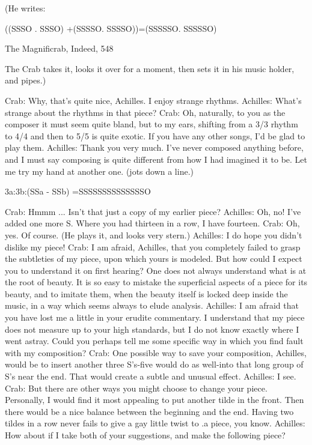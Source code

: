 {   (He writes:

                 ((SSSO . SSSO) +(SSSSO. SSSSO))=(SSSSSO. SSSSSO)



   The Magnificrab, Indeed,                                                                  548

  The Crab takes it, looks it over for a moment, then sets it in his music holder, and pipes.)

Crab: Why, that's quite nice, Achilles. I enjoy strange rhythms.
Achilles: What's strange about the rhythms in that piece?
Crab: Oh, naturally, to you as the composer it must seem quite bland, but to my ears,
  shifting from a 3/3 rhythm to 4/4 and then to 5/5 is quite exotic. If you have any other
  songs, I'd be glad to play them. Achilles: Thank you very much. I've never composed
  anything before, and I must say composing is quite different from how I had imagined it
  to be. Let me try my hand at another one. (jots down a line.)

                         3a:3b:(SSa - SSb) =SSSSSSSSSSSSSSO

Crab: Hmmm ... Isn't that just a copy of my earlier piece?
Achilles: Oh, no! I've added one more S. Where you had thirteen in a row, I have fourteen.
Crab: Oh, yes. Of course. (He plays it, and looks very stern.)
Achilles: I do hope you didn't dislike my piece!
Crab: I am afraid, Achilles, that you completely failed to grasp the subtleties of my piece,
  upon which yours is modeled. But how could I expect you to understand it on first
  hearing? One does not always understand what is at the root of beauty. It is so easy to
  mistake the superficial aspects of a piece for its beauty, and to imitate them, when the
  beauty itself is locked deep inside the music, in a way which seems always to elude
  analysis.
Achilles: I am afraid that you have lost me a little in your erudite commentary. I understand
  that my piece does not measure up to your high standards, but I do not know exactly
  where I went astray. Could you perhaps tell me some specific way in which you find fault
  with my composition?
Crab: One possible way to save your composition, Achilles, would be to insert another three
  S's-five would do as well-into that long group of S's near the end. That would create a
  subtle and unusual effect.
Achilles: I see.
Crab: But there are other ways you might choose to change your piece. Personally, I would
  find it most appealing to put another tilde in the front. Then there would be a nice balance
  between the beginning and the end. Having two tildes in a row never fails to give a gay
  little twist to .a piece, you know.
Achilles: How about if I take both of your suggestions, and make the following piece?

}
